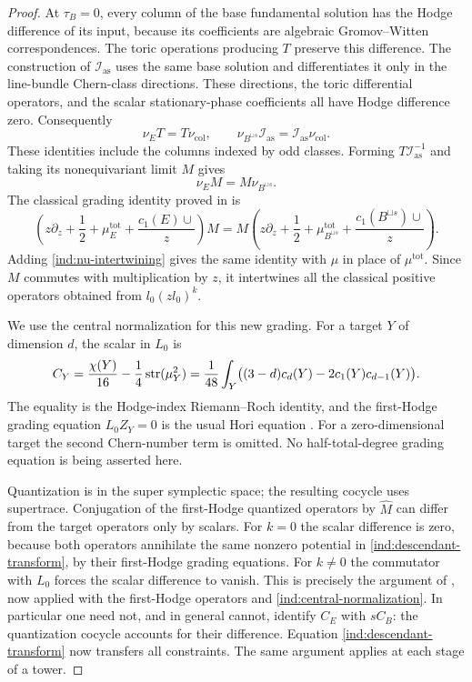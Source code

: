 \begin{proof}
At $\tau_B=0$, every column of the base fundamental solution has the
Hodge difference of its input, because its coefficients are algebraic
Gromov--Witten correspondences. The toric operations producing $T$
preserve this difference. The construction of $\mathcal I_{\mathrm{as}}$
uses the same base solution and differentiates it only in the
line-bundle Chern-class directions. These directions, the toric
differential operators, and the scalar stationary-phase coefficients
all have Hodge difference zero. Consequently
\[
 \nu_E T=T\nu_{\mathrm{col}},\qquad
 \nu_{B^{\sqcup s}}\mathcal I_{\mathrm{as}}
       =\mathcal I_{\mathrm{as}}\nu_{\mathrm{col}}.
\]
These identities include the columns indexed by odd classes. Forming
$T\mathcal I_{\mathrm{as}}^{-1}$ and taking its nonequivariant limit
$M$ gives
\begin{equation}
\label{ind:nu-intertwining}
 \nu_E M=M\nu_{B^{\sqcup s}}.
\end{equation}
The classical grading identity proved in
\cite[\S4.4, Equations~(42) and~(44)]{CGT} is
\[
 \left(z\partial_z+\frac12+\mu_E^{\mathrm{tot}}
          +\frac{c_1(E)\cup}{z}\right)M
 =M\left(z\partial_z+\frac12+\mu_{B^{\sqcup s}}^{\mathrm{tot}}
          +\frac{c_1(B^{\sqcup s})\cup}{z}\right).
\]
Adding \eqref{ind:nu-intertwining} gives the same identity with $\mu$ in
place of $\mu^{\mathrm{tot}}$. Since $M$ commutes with multiplication by
$z$, it intertwines all the classical positive operators obtained from
$l_0(zl_0)^k$.

We use the central normalization for this new grading. For a target
$Y$ of dimension $d$, the scalar in $L_0$ is
\begin{equation}
\label{ind:central-normalization}
 C_Y=\frac{\chi(Y)}{16}-\frac14\operatorname{str}(\mu_Y^2)
 =\frac1{48}\int_Y\bigl((3-d)c_d(Y)
                  -2c_1(Y)c_{d-1}(Y)\bigr).
\end{equation}
The equality is the Hodge-index Riemann--Roch identity, and the
first-Hodge grading equation $L_0Z_Y=0$ is the usual Hori equation
\cite[Theorem~2.1 and Proposition~2.6]{Getzler1999}. For a
zero-dimensional target the second Chern-number term is omitted.
No half-total-degree grading equation is being asserted here.

Quantization is in the super symplectic space; the resulting cocycle
uses supertrace. Conjugation of the first-Hodge quantized operators by
$\widehat M$ can differ from the target operators only by scalars.
For $k=0$ the scalar difference is zero, because both operators
annihilate the same nonzero potential in
\eqref{ind:descendant-transform}, by their first-Hodge grading
equations. For $k\ne0$ the commutator with $L_0$ forces the scalar
difference to vanish. This is precisely the argument of
\cite[Proposition~1.3]{CGT}, now applied with the first-Hodge operators
and \eqref{ind:central-normalization}. In particular one need not, and
in general cannot, identify $C_E$ with $sC_B$: the quantization cocycle
accounts for their difference. Equation
\eqref{ind:descendant-transform} now transfers all constraints. The
same argument applies at each stage of a tower.
\end{proof}

